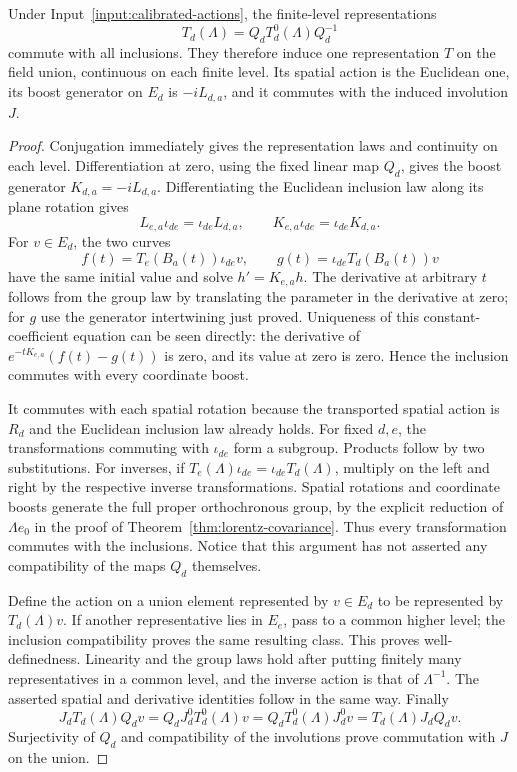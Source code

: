\begin{proposition}\label{prop:lorentz-label-descent}
Under Input~\ref{input:calibrated-actions}, the finite-level representations
\[
 T_d(\Lambda)=Q_dT_d^0(\Lambda)Q_d^{-1}
\]
commute with all inclusions. They therefore induce one representation
$T$ on the field union, continuous on each finite level. Its spatial
action is the Euclidean one, its boost generator on $E_d$ is
$-iL_{d,a}$, and it commutes with the induced involution $J$.
\end{proposition}
\begin{proof}
Conjugation immediately gives the representation laws and continuity on
each level. Differentiation at zero, using the fixed linear map $Q_d$,
gives the boost generator $K_{d,a}=-iL_{d,a}$. Differentiating the
Euclidean inclusion law along its plane rotation gives
\[
 L_{e,a}\iota_{de}=\iota_{de}L_{d,a},
 \qquad K_{e,a}\iota_{de}=\iota_{de}K_{d,a}.
\]
For $v\in E_d$, the two curves
\[
 f(t)=T_e(B_a(t))\iota_{de}v,\qquad
 g(t)=\iota_{de}T_d(B_a(t))v
\]
have the same initial value and solve $h'=K_{e,a}h$. The derivative at
arbitrary $t$ follows from the group law by translating the parameter in
the derivative at zero; for $g$ use the generator intertwining just proved.
Uniqueness of this constant-coefficient equation can be seen directly:
the derivative of $e^{-tK_{e,a}}(f(t)-g(t))$ is zero, and its value at
zero is zero. Hence the inclusion commutes with every coordinate boost.

It commutes with each spatial rotation because the transported spatial
action is $R_d$ and the Euclidean inclusion law already holds.
For fixed $d,e$, the transformations commuting with $\iota_{de}$ form
a subgroup. Products follow by two substitutions. For inverses, if
$T_e(\Lambda)\iota_{de}=\iota_{de}T_d(\Lambda)$, multiply on the left
and right by the respective inverse transformations. Spatial rotations
and coordinate boosts generate the full proper orthochronous group, by
the explicit reduction of $\Lambda e_0$ in the proof of
Theorem~\ref{thm:lorentz-covariance}. Thus every transformation commutes
with the inclusions. Notice that this argument has not asserted any
compatibility of the maps $Q_d$ themselves.

Define the action on a union element represented by $v\in E_d$ to be
represented by $T_d(\Lambda)v$. If another representative lies in $E_e$,
pass to a common higher level; the inclusion compatibility proves the
same resulting class. This proves well-definedness. Linearity and the
group laws hold after putting finitely many representatives in a common
level, and the inverse action is that of $\Lambda^{-1}$. The asserted
spatial and derivative identities follow in the same way. Finally
\[
 J_dT_d(\Lambda)Q_dv
 =Q_dJ_d^0T_d^0(\Lambda)v
 =Q_dT_d^0(\Lambda)J_d^0v
 =T_d(\Lambda)J_dQ_dv.
\]
Surjectivity of $Q_d$ and compatibility of the involutions prove
commutation with $J$ on the union.
\end{proof}
